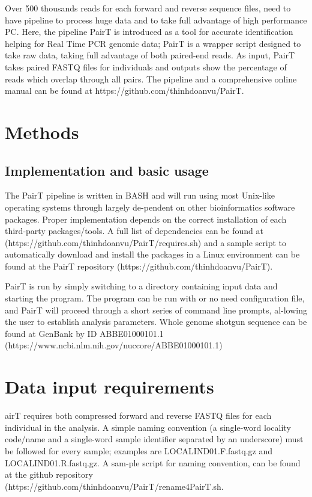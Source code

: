 \documentclass[conference]{IEEEtran}
\begin{document}
Over 500 thousands reads for each forward and reverse sequence files, need to have pipeline to process huge data and to take full advantage of high performance PC. Here, the pipeline PairT is introduced as a tool for accurate identification helping for Real Time PCR genomic data; PairT is a wrapper script designed to take raw data, taking full advantage of both paired-end reads. As input, PairT takes paired FASTQ files for individuals and outputs show the percentage of reads which overlap through all pairs. The pipeline and a comprehensive online manual can be found at https://github.com/thinhdoanvu/PairT.

\section{Methods}

\subsection{Implementation and basic usage}

The PairT pipeline is written in BASH and will run using most Unix-like operating systems through largely de-pendent on other bioinformatics software packages. Proper implementation depends on the correct installation of each third-party packages/tools. A full list of dependencies can be found at (https://github.com/thinhdoanvu/PairT/requires.sh) and a sample script to automatically download and install the packages in a Linux environment can be found at the PairT repository (https://github.com/thinhdoanvu/PairT).

PairT is run by simply switching to a directory containing input data and starting the program. The program can be run with or no need configuration file, and PairT will proceed through a short series of command line prompts, al-lowing the user to establish analysis parameters. Whole genome shotgun sequence can be found at GenBank by ID ABBE01000101.1 (https://www.ncbi.nlm.nih.gov/nuccore/ABBE01000101.1)

\section{Data input requirements}
airT requires both compressed forward and reverse FASTQ files for each individual in the analysis. A simple naming convention (a single-word locality code/name and a single-word sample identifier separated by an underscore) must be followed for every sample; examples are LOCAL\textunderscore IND01.F.fastq.gz and LOCAL\textunderscore IND01.R.fastq.gz. A sam-ple script for naming convention, can be found at the github repository (https://github.com/thinhdoanvu/PairT/rename4PairT.sh.
\end{document}
